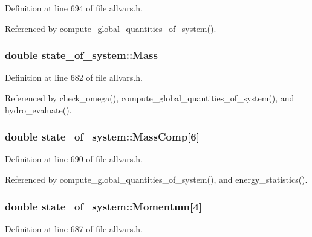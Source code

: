 Definition at line 694 of file allvars.h.



Referenced by compute\_\-global\_\-quantities\_\-of\_\-system().

\hypertarget{structstate__of__system_a8a3263df2542de95325b0684814dab52}{
\subsubsection[{Mass}]{\setlength{\rightskip}{0pt plus 5cm}double {\bf state\_\-of\_\-system::Mass}}}
\label{structstate__of__system_a8a3263df2542de95325b0684814dab52}


Definition at line 682 of file allvars.h.



Referenced by check\_\-omega(), compute\_\-global\_\-quantities\_\-of\_\-system(), and hydro\_\-evaluate().

\hypertarget{structstate__of__system_a760dbd458028ff092d8fab04f54f90ff}{
\subsubsection[{MassComp}]{\setlength{\rightskip}{0pt plus 5cm}double {\bf state\_\-of\_\-system::MassComp}\mbox{[}6\mbox{]}}}
\label{structstate__of__system_a760dbd458028ff092d8fab04f54f90ff}


Definition at line 690 of file allvars.h.



Referenced by compute\_\-global\_\-quantities\_\-of\_\-system(), and energy\_\-statistics().

\hypertarget{structstate__of__system_a052f3f69811197adc33ecb8c4c1f8d6e}{
\subsubsection[{Momentum}]{\setlength{\rightskip}{0pt plus 5cm}double {\bf state\_\-of\_\-system::Momentum}\mbox{[}4\mbox{]}}}
\label{structstate__of__system_a052f3f69811197adc33ecb8c4c1f8d6e}


Definition at line 687 of file allvars.h.



